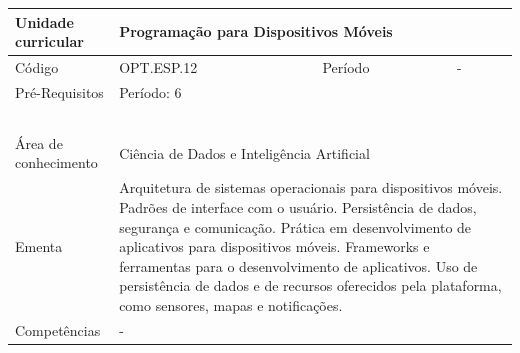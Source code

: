 \begin{quadro}[ht!]
  \centering\scriptsize
\caption{Unidade Curricular Programação para Dispositivos Móveis}

\begin{tabular}{|p{2.5cm}|p{2.5cm}|p{2.5cm}|p{2.5cm}|p{2.5cm}|}\hline

  Unidade curricular & \multicolumn{4}{p{10cm}|}{ Programação para Dispositivos Móveis }\\\hline
  Código & OPT.ESP.12 & Período & \multicolumn{2}{p{5cm}|}{ - }\\\hline
  Pré-Requisitos & \multicolumn{4}{p{10cm}|}{ Período: 6 } \\\hline
  \cellcolor{blue1}{ CH PRESENCIAL } &
    \cellcolor{blue1}{CH EAD Síncrona} &
    \cellcolor{blue1}{CH EAD Síncrona Mediada} &
    \cellcolor{blue1}{CH EAD Assíncrona} &
    \cellcolor{blue1}{CH APCC} \\\hline
  \cellcolor{blue1}{ 60 } &
    \cellcolor{blue1}{ 0 } &
    \cellcolor{blue1}{ 30 } &
    \cellcolor{blue1}{ 30 } &
    \cellcolor{blue1}{0} \\\hline
  \cellcolor{blue1}{ CH Teórica } &
    \cellcolor{blue1}{CH Prática} &
    \cellcolor{blue1}{CH Humanidades} &
    \cellcolor{blue1}{CH Extensão} &
    \cellcolor{blue1}{CH EAD TOTAL} \\\hline
  \cellcolor{blue1}{ 30 } &
    \cellcolor{blue1}{ 30 } &
    \cellcolor{blue1}{ 0 } &
    \cellcolor{blue1}{ 0 } &
    \cellcolor{blue1}{ 60 } \\\hline
  \cellcolor{blue1}{CARGA-HORÁRIA TOTAL} & \multicolumn{4}{p{10cm}|}{ \cellcolor{blue1}{ 60 } } \\\hline
  Área de conhecimento & \multicolumn{4}{p{10cm}|}{ Ciência de Dados e Inteligência Artificial } \\\hline
  Ementa & \multicolumn{4}{p{10cm}|}{ Arquitetura de sistemas operacionais para dispositivos móveis. Padrões de interface com o usuário. Persistência de dados, segurança e comunicação. Prática em desenvolvimento de aplicativos para dispositivos móveis. Frameworks e ferramentas para o desenvolvimento de aplicativos. Uso de persistência de dados e de recursos oferecidos pela plataforma, como sensores, mapas e notificações. } \\\hline
  Competências & \multicolumn{4}{p{10cm}|}{ - } \\\hline


  
	\end{tabular}

\end{quadro}


\clearpage
\newpage

